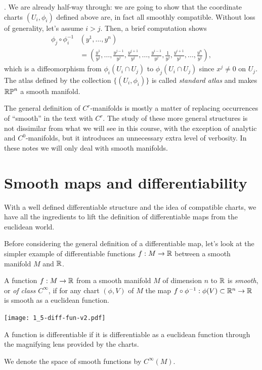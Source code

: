 \begin{example}
  .
  We are already half-way through: we are going to show that the coordinate charts $(U_i, \phi_i)$ defined above are, in fact all smoothly compatible.
  Without loss of generality, let's assume $i>j$.
  Then, a brief computation shows
  \begin{align}
    \phi_j\circ\phi_i^{-1}& (y^1, \ldots, y^n) \\
    &= \left(\frac{y^1}{y^j},\ldots,\frac{y^{j-1}}{y^j},\frac{y^{j+1}}{y^j},\ldots,\frac{y^{i-1}}{y^j},\frac1{y^j},\frac{y^{i+1}}{y^j}, \ldots, \frac{y^n}{y^j}\right),
  \end{align}
  which is a diffeomorphism from $\phi_i(U_i\cap U_j)$ to $\phi_j(U_i\cap U_j)$ since $x^j\neq 0$ on $U_j$.
  The atlas defined by the collection $\{(U_i, \phi_i)\}$ is called \emph{standard atlas} and makes $\mathbb{RP}^n$ a smooth manifold. 
\end{example}

\begin{tcolorbox}
  The general definition of $C^r$-manifolds is mostly a matter of replacing occurrences of ``smooth'' in the text with $C^r$.
  The study of these more general structures is not dissimilar from what we will see in this course, with the exception of analytic and $C^0$-manifolds, but it introduces an unnecessary extra level of verbosity.
  In these notes we will only deal with smooth manifolds.
\end{tcolorbox}

\section{Smooth maps and differentiability}

With a well defined differentiable structure and the idea of compatible charts, we have all the ingredients to lift the definition of differentiable maps from the euclidean world.

Before considering the general definition of a differentiable map, let's look at the simpler example of differentiable functions $f:M\to\mathbb{R}$ between a smooth manifold $M$ and $\mathbb{R}$.

\begin{definition}
  A function $f:M\to\mathbb{R}$ from a smooth manifold $M$ of dimension $n$ to $\mathbb{R}$ is \emph{smooth}, or \emph{of class $C^\infty$}, if for any chart $(\phi, V)$ of $M$ the map $f\circ\phi^{-1}:\phi(V)\subset\mathbb{R}^n \to \mathbb{R}$ is smooth as a euclidean function.
  \begin{marginfigure}
    \texttt{[image: 1\_5-diff-fun-v2.pdf]}
    \label{fig:diff-fun}
    \caption{A function is differentiable if it is differentiable as a euclidean function through the magnifying lens provided by the charts.}
  \end{marginfigure}
  We denote the space of smooth functions by $C^\infty(M)$.
\end{definition}

